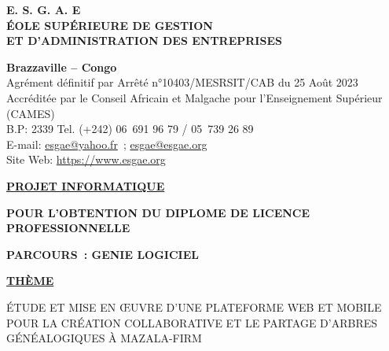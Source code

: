\begin{titlepage}
  \begin{center}

    \large {
      \textbf{
        E. S. G. A. E \\
        ÉOLE SUPÉRIEURE DE GESTION \\
        ET D’ADMINISTRATION DES ENTREPRISES \\
      }
    }

    \vspace{0.2cm}

    \large {
      \textbf{ Brazzaville – Congo } \\
      Agrément définitif par Arrêté n°10403/MESRSIT/CAB du 25 Août 2023 \\
      Accréditée par le Conseil Africain et Malgache pour l’Enseignement Supérieur (CAMES) \\
      B.P: 2339 Tel. (+242) 06 691 96 79 / 05 739 26 89 \\
      E-mail: \href{mailto:esgae@yahoo.fr}{esgae@yahoo.fr} ; \href{mailto:esgae@esgae.org}{esgae@esgae.org} \\
      Site Web: \url {https://www.esgae.org} \\
    }

    \vspace{0.5cm}

    \dotfill

    \vspace{0.5cm}

    \large {
      \textbf { \underline {PROJET INFORMATIQUE} }
    }

    \vspace{0.2cm}
    \large {
      \textbf{POUR L’OBTENTION DU DIPLOME DE LICENCE PROFESSIONNELLE}
    }

    \vspace{0.2cm}
    \large {
      \textbf{PARCOURS : GENIE LOGICIEL}
    }

    \vspace{1.5cm}

    \normalsize {
    \textbf { \underline {THÈME} }
    }

    \begin{tcolorbox}[sharp corners=uphill,
    arc=6mm,boxrule=2mm,boxsep=5mm,
    ]
    \centering
    \large {
      ÉTUDE ET MISE EN ŒUVRE D’UNE PLATEFORME WEB ET MOBILE POUR LA CRÉATION
      COLLABORATIVE ET LE PARTAGE D’ARBRES GÉNÉALOGIQUES À MAZALA-FIRM
    }
    \end{tcolorbox}
  \end{center}


\end{titlepage}
